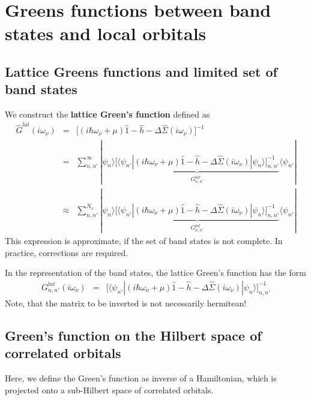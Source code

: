 \documentclass[11pt,a4paper]{report}
\begin{document}
\section{Greens functions between band states and local orbitals}
\subsection{Lattice Greens functions and limited set of band states}
We construct the \textbf{lattice Green's function} defined as
\begin{eqnarray}
\hat{G}^{lat}(i\omega_\nu)&=&
\biggl[(i\hbar\omega_\nu+\mu)\hat{1}
-\hat{h}-\Delta\hat{\Sigma}(i\omega_\nu)\biggr]^{-1}
\nonumber\\
&=&\sum_{n,n'}^\infty|\psi_n\rangle
\underbrace{
\biggl[\langle\psi_{n'}|(i\hbar\omega_\nu+\mu)\hat{1}-\hat{h}
-\Delta\hat{\Sigma}(i\omega_\nu)|\psi_n\rangle\biggr]_{n,n'}^{-1}
}_{G^{lat}_{n,n'}}
\langle\psi_{n'}|
\nonumber\\
&\approx&\sum_{n,n'}^{N_x}|\psi_n\rangle
\underbrace{
\biggl[\langle\psi_{n'}|(i\hbar\omega_\nu+\mu)\hat{1}-\hat{h}
-\Delta\hat{\Sigma}(i\omega_\nu)|\psi_n\rangle\biggr]_{n,n'}^{-1}
}_{G^{lat}_{n,n'}}
\langle\psi_{n'}|
\label{eq:latgreenfunc}
\end{eqnarray}
This expression is approximate, if the set of band states is not
complete. In practice, corrections are required.

In the representation of the band states, the lattice Green's function
has the form
\begin{eqnarray}
G^{lat}_{n,n'}(i\omega_\nu)&=&
\biggl[\langle\psi_{n'}|(i\hbar\omega_\nu+\mu)\hat{1}-\hat{h}
-\Delta\hat{\Sigma}(i\omega_\nu)|\psi_n\rangle\biggr]_{n,n'}^{-1}
\label{eq:latgreenfuncmat}
\end{eqnarray}
Note, that the matrix to be inverted is not necessarily hermitean!


\subsection{Green's function on the Hilbert space of correlated orbitals}
Here, we define the Green's function as inverse of a Hamiltonian,
which is projected onto a sub-Hilbert space of correlated
orbitals. 
\end{document}
